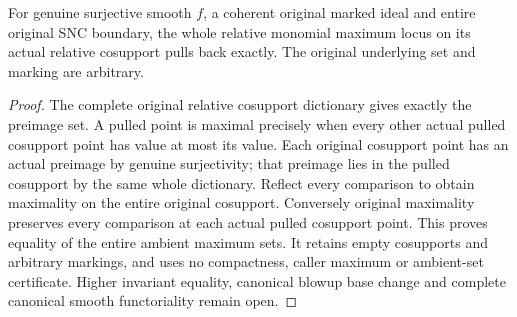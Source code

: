 \begin{theorem}
\label{hir:smooth-relative-monomial-whole-maximum}
For genuine surjective smooth $f$, a coherent original marked ideal and
entire original SNC boundary, the whole relative monomial maximum locus
on its actual relative cosupport pulls back exactly. The original
underlying set and marking are arbitrary.
\end{theorem}
\begin{proof}
The complete original relative cosupport dictionary gives exactly the
preimage set. A pulled point is maximal precisely when every other actual
pulled cosupport point has value at most its value. Each original
cosupport point has an actual preimage by genuine surjectivity; that
preimage lies in the pulled cosupport by the same whole dictionary.
Reflect every comparison to obtain maximality on the entire original
cosupport. Conversely original maximality preserves every comparison at
each actual pulled cosupport point. This proves equality of the entire
ambient maximum sets. It retains empty cosupports and arbitrary markings,
and uses no compactness, caller maximum or ambient-set certificate.
Higher invariant equality, canonical blowup base change and complete
canonical smooth functoriality remain open.
\end{proof}
\leanok
